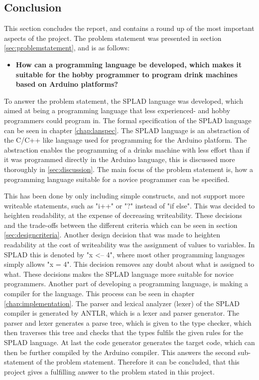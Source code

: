 \subsection{Conclusion}
This section concludes the report, and contains a round up of the most important aspects of the project.
The problem statement was presented in section \ref{sec:problemstatement}, and is as follows: 
\begin{itemize}
	\item \textbf{How can a programming language be developed, which makes it suitable for the hobby programmer to program drink machines based on Arduino platforms?}
\end{itemize}

To answer the problem statement, the SPLAD language was developed, which aimed at being a programming language that less experienced- and hobby programmers could program in. The formal specification of the SPLAD language can be seen in chapter \ref{chap:lanspec}. The SPLAD language is an abstraction of the C/C++ like language used for programming for the Arduino platform. The abstraction enables the programming of a drinks machine with less effort than if it was programmed directly in the Arduino language, this is discussed more thoroughly in \ref{sec:discussion}. The main focus of the problem statement is, how a programming language suitable for a novice programmer can be specified.

This has been done by only including simple constructs, and not support more writeable statements, such as "i++" or "?" instead of "if else". This was decided to heighten readability, at the expense of decreasing writeability. These decisions and the trade-offs between the different criteria which can be seen in section \ref{sec:designcriteria}. Another design decision that was made to heighten readability at the cost of writeability was the assignment of values to variables. In SPLAD this is denoted by "x <-- 4", where most other programming languages simply allows "x = 4". This decision removes any doubt about what is assigned to what. These decisions makes the SPLAD language more suitable for novice programmers.
Another part of developing a programming language, is making a compiler for the language. This process can be seen in chapter \ref{chap:implementation}. The parser and lexical analyzer (lexer) of the SPLAD compiler is generated by ANTLR, which is a lexer and parser generator. The parser and lexer generates a parse tree, which is given to the type checker, which then traverses this tree and checks that the types fulfils the given rules for the SPLAD language. At last the code generator generates the target code, which can then be further compiled by the Arduino compiler. This answers the second sub-statement of the problem statement. Therefore it can be concluded, that this project gives a fulfilling answer to the problem stated in this project. 
